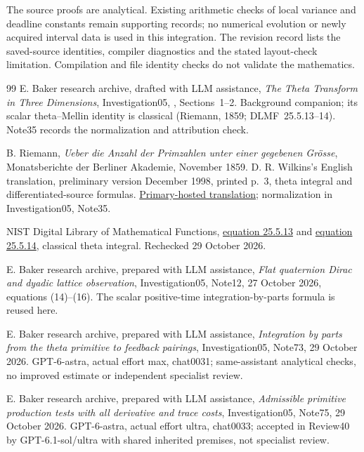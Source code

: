 \documentclass[11pt]{article}
\numberwithin{equation}{section}
\begin{document}
The source proofs are analytical. Existing arithmetic checks of local
variance and deadline constants remain supporting records; no numerical
evolution or newly acquired interval data is used in this integration.
The revision record lists the saved-source identities, compiler
diagnostics and the stated layout-check limitation. Compilation and
file identity checks do not validate the mathematics.


\begin{thebibliography}{99}
E. Baker research archive, drafted with LLM assistance,
\emph{The Theta Transform in Three Dimensions}, Investigation05,
, Sections~1--2. Background companion; its scalar
theta--Mellin identity is classical (Riemann, 1859; DLMF~25.5.13--14).
Note35 records the normalization and attribution check.

B. Riemann, \emph{Ueber die Anzahl der Primzahlen unter einer gegebenen
Gr\"osse}, Monatsberichte der Berliner Akademie, November 1859.
D. R. Wilkins's English translation, preliminary version December 1998,
printed p.~3, theta integral and differentiated-source formulas.
\href{https://www.maths.tcd.ie/pub/HistMath/People/Riemann/Zeta/EZeta.pdf}
{Primary-hosted translation}; normalization in Investigation05, Note35.

NIST Digital Library of Mathematical Functions,
\href{https://dlmf.nist.gov/25.5.E13}{equation 25.5.13} and
\href{https://dlmf.nist.gov/25.5.E14}{equation 25.5.14},
classical theta integral. Rechecked 29 October 2026.

E. Baker research archive, prepared with LLM assistance,
\emph{Flat quaternion Dirac and dyadic lattice observation},
Investigation05, Note12, 27 October 2026, equations (14)--(16).
The scalar positive-time integration-by-parts formula is reused here.

E. Baker research archive, prepared with LLM assistance,
\emph{Integration by parts from the theta primitive to feedback pairings},
Investigation05, Note73, 29 October 2026.
GPT-6-astra, actual effort max, chat0031; same-assistant analytical
checks, no improved estimate or independent specialist review.

E. Baker research archive, prepared with LLM assistance,
\emph{Admissible primitive production tests with all derivative and trace
costs}, Investigation05, Note75, 29 October 2026.
GPT-6-astra, actual effort ultra, chat0033; accepted in Review40 by
GPT-6.1-sol/ultra with shared inherited premises, not specialist review.


\end{thebibliography}
\end{document}
